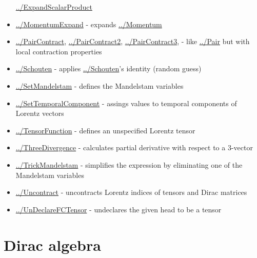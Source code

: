 \documentclass[../FeynCalcManual.tex]{subfiles}
\begin{document}
\begin{itemize}
  \hyperlink{../expandscalarproduct}{../ExpandScalarProduct}
\item
  \hyperlink{../momentumexpand}{../MomentumExpand} - expands
  \hyperlink{../momentum}{../Momentum}
\item
  \hyperlink{../paircontract}{../PairContract},
  \hyperlink{../paircontract2}{../PairContract2},
  \hyperlink{../paircontract3}{../PairContract3}, - like
  \hyperlink{../pair}{../Pair} but with local contraction properties
\item
  \hyperlink{../schouten}{../Schouten} - applies
  \hyperlink{../schouten}{../Schouten}'s identity (random guess)
\item
  \hyperlink{../setmandelstam}{../SetMandelstam} - defines the
  Mandelstam variables
\item
  \hyperlink{../settemporalcomponent}{../SetTemporalComponent} - assings
  values to temporal components of Lorentz vectors
\item
  \hyperlink{../tensorfunction}{../TensorFunction} - defines an
  unspecified Lorentz tensor
\item
  \hyperlink{../threedivergence}{../ThreeDivergence} - calculates
  partial derivative with respect to a \(3\)-vector
\item
  \hyperlink{../trickmandelstam}{../TrickMandelstam} - simplifies the
  expression by eliminating one of the Mandelstam variables
\item
  \hyperlink{../uncontract}{../Uncontract} - uncontracts Lorentz indices
  of tensors and Dirac matrices
\item
  \hyperlink{../undeclarefctensor}{../UnDeclareFCTensor} - undeclares
  the given head to be a tensor
\end{itemize}

\hypertarget{dirac algebra}{
\section{Dirac algebra}\label{dirac algebra}}
\end{document}
